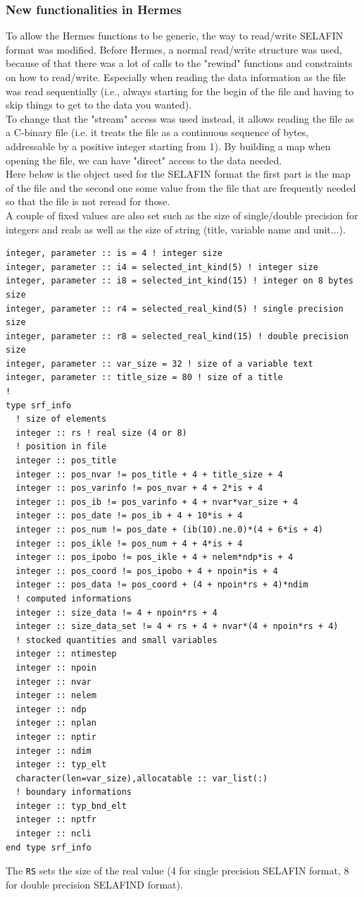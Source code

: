 %
\subsubsection{New functionalities in Hermes}
%
To allow the Hermes functions to be generic, the way to read/write SELAFIN
format was modified. Before Hermes, a normal read/write structure was used,
because of that there was a lot of calls to the "rewind" functions and
constraints on how to read/write. Especially when reading the data information
as the file was read sequentially (i.e., always starting for the begin of the
file and having to skip things to get to the data you wanted).\\
%
To change that the "stream" access was used instead, it allows reading the file
as a C-binary file (i.e. it treats the file as a continuous sequence of bytes,
addressable by a positive integer starting from 1). By building a map when
opening the file, we can have "direct" access to the data needed.\\
%
Here below is the object used for the SELAFIN format the first part is the map
of the file and the second one some value from the file that are frequently
needed so that the file is not reread for those.\\
%
A couple of fixed values are also set such as the size of single/double
precision for integers and reals as well as the size of string (title, variable
name and unit...).
%
\begin{lstlisting}
integer, parameter :: is = 4 ! integer size
integer, parameter :: i4 = selected_int_kind(5) ! integer size
integer, parameter :: i8 = selected_int_kind(15) ! integer on 8 bytes size
integer, parameter :: r4 = selected_real_kind(5) ! single precision size
integer, parameter :: r8 = selected_real_kind(15) ! double precision size
integer, parameter :: var_size = 32 ! size of a variable text
integer, parameter :: title_size = 80 ! size of a title
!
type srf_info
  ! size of elements
  integer :: rs ! real size (4 or 8)
  ! position in file
  integer :: pos_title
  integer :: pos_nvar != pos_title + 4 + title_size + 4
  integer :: pos_varinfo != pos_nvar + 4 + 2*is + 4
  integer :: pos_ib != pos_varinfo + 4 + nvar*var_size + 4
  integer :: pos_date != pos_ib + 4 + 10*is + 4
  integer :: pos_num != pos_date + (ib(10).ne.0)*(4 + 6*is + 4)
  integer :: pos_ikle != pos_num + 4 + 4*is + 4
  integer :: pos_ipobo != pos_ikle + 4 + nelem*ndp*is + 4
  integer :: pos_coord != pos_ipobo + 4 + npoin*is + 4
  integer :: pos_data != pos_coord + (4 + npoin*rs + 4)*ndim
  ! computed informations
  integer :: size_data != 4 + npoin*rs + 4
  integer :: size_data_set != 4 + rs + 4 + nvar*(4 + npoin*rs + 4)
  ! stocked quantities and small variables
  integer :: ntimestep
  integer :: npoin
  integer :: nvar
  integer :: nelem
  integer :: ndp
  integer :: nplan
  integer :: nptir
  integer :: ndim
  integer :: typ_elt
  character(len=var_size),allocatable :: var_list(:)
  ! boundary informations
  integer :: typ_bnd_elt
  integer :: nptfr
  integer :: ncli
end type srf_info
\end{lstlisting}
%
The \verb!RS! sets the size of the real value (4 for single precision SELAFIN
format, 8 for double precision SELAFIND format).
%

